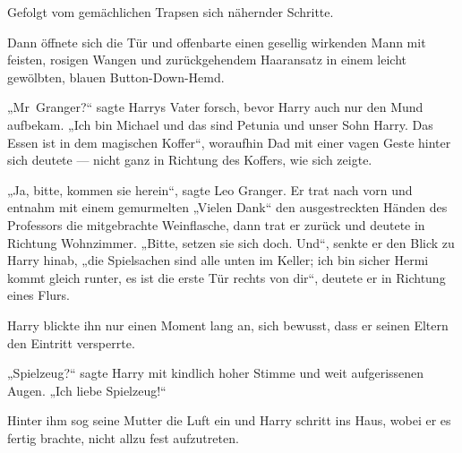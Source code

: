 Gefolgt vom gemächlichen Trapsen sich nähernder Schritte.

Dann öffnete sich die Tür und offenbarte einen gesellig wirkenden Mann mit feisten, rosigen Wangen und zurückgehendem Haaransatz in einem leicht gewölbten, blauen Button-Down-Hemd.

„Mr~Granger?“ sagte Harrys Vater forsch, bevor Harry auch nur den Mund aufbekam.
„Ich bin Michael und das sind Petunia und unser Sohn Harry. Das Essen ist in dem magischen Koffer“, woraufhin Dad mit einer vagen Geste hinter sich deutete — nicht ganz in Richtung des Koffers, wie sich zeigte.

„Ja, bitte, kommen sie herein“, sagte Leo Granger. Er trat nach vorn und entnahm mit einem gemurmelten
„Vielen Dank“ den ausgestreckten Händen des Professors die mitgebrachte Weinflasche, dann trat er zurück und deutete in Richtung Wohnzimmer.
„Bitte, setzen sie sich doch. Und“, senkte er den Blick zu Harry hinab, „die Spielsachen sind alle unten im Keller; ich bin sicher Hermi kommt gleich runter, es ist die erste Tür rechts von dir“, deutete er in Richtung eines Flurs.

Harry blickte ihn nur einen Moment lang an, sich bewusst, dass er seinen Eltern den Eintritt versperrte.

„Spielzeug?“ sagte Harry mit kindlich hoher Stimme und weit aufgerissenen Augen.
„Ich liebe Spielzeug!“

Hinter ihm sog seine Mutter die Luft ein und Harry schritt ins Haus, wobei er es fertig brachte, nicht allzu fest aufzutreten.

